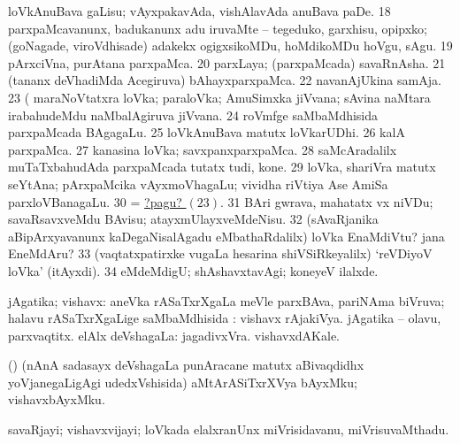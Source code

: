 \begin{center}
 loVkAnuBava gaLisu; vAyxpakavAda, vishAlavAda anuBava paDe. 
\eanum
\numie
\num{18}  parxpaMcavanunx, badukanunx adu iruvaMte -- tegeduko, garxhisu, opipxko; (goNagade, viroVdhisade) adakekx ogigxsikoMDu, hoMdikoMDu hoVgu, sAgu. 
\num{19}  pArxciVna, purAtana parxpaMca. 
\num{20}  parxLaya; (parxpaMcada) savaRnAsha. 
\num{21}  (tananx deVhadiMda Acegiruva) bAhayxparxpaMca. 
\num{22}  navanAjUkina samAja. 
\hypertarget{world pagu23}{} 
\num{23}  (  maraNoVtatxra loVka; paraloVka; AmuSimxka jiVvana; sAvina naMtara irabahudeMdu naMbalAgiruva jiVvana. 
\num{24}  roVmfge saMbaMdhisida parxpaMcada BAgagaLu. 
\num{25}  loVkAnuBava matutx loVkarUDhi. 
\num{26}  kalA parxpaMca. 
\num{27}  kanasina loVka; savxpanxparxpaMca. 
\num{28}  saMcAradalilx muTaTxbahudAda parxpaMcada tutatx tudi, kone. 
\num{29}  loVka, shariVra matutx seYtAna; pArxpaMcika vAyxmoVhagaLu; vividha riVtiya Ase AmiSa parxloVBanagaLu. 
\num{30}  = \hyperlink{world pagu23}{?pagu? \((23)\)}. 
\num{31}  BAri gwrava, mahatatx vx niVDu; savaRsavxveMdu BAvisu; atayxmUlayxveMdeNisu. 
\num{32}  (sAvaRjanika aBipArxyavanunx kaDegaNisalAgadu eMbathaRdalilx) loVka EnaMdiVtu? jana EneMdAru? 
\num{33}  (vaqtatxpatirxke \mo vugaLa hesarina shiVSiRkeyalilx) `reVDiyoV loVka' (itAyxdi). 
\num{34}  eMdeMdigU; shAshavxtavAgi; koneyeV ilalxde. 
\enum
\emng
\eentry

\bentry
{} 
\gl{\gu}
\expl{}
\bmng
jAgatika; vishavx: 
\banum
{} aneVka rASaTxrXgaLa meVle parxBAva, pariNAma biVruva; halavu rASaTxrXgaLige saMbaMdhisida :  vishavx rAjakiVya.  jAgatika -- olavu, parxvaqtitx. 
 elAlx deVshagaLa:  jagadivxVra.  vishavxdAKale. 
\eanum
\emng
\eentry

\bentry
{} 
\gl{\nA}
\expl{}
\bmng
(\AmA) (nAnA sadasayx deVshagaLa punAracane matutx aBivaqdidhx yoVjanegaLigAgi udedxVshisida) aMtArASiTxrXVya bAyxMku; vishavxbAyxMku. 
\emng
\eentry

\bentry
{} 
\gl{\nA}
\expl{}
\bmng
savaRjayi; vishavxvijayi; loVkada elalxranUnx miVrisidavanu, miVrisuvaMthadu. 
\emng
\eentry


\end{center}
